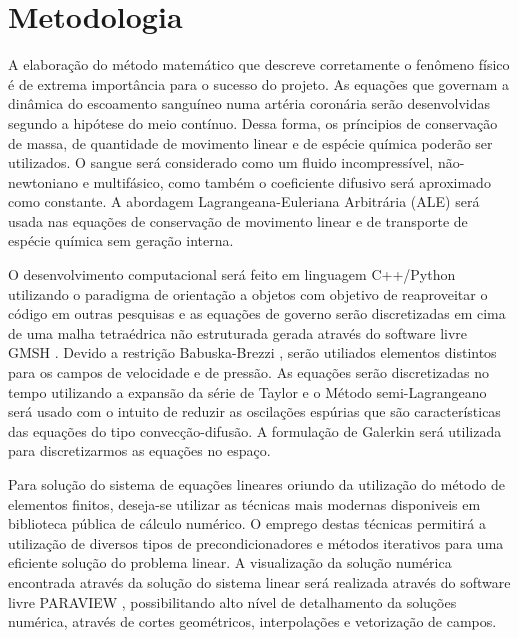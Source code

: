 \section{Metodologia}

A elaboração do método matemático que descreve corretamente o fenômeno físico é de extrema importância para o sucesso do projeto. 
As equações que governam a dinâmica do escoamento sanguíneo numa artéria coronária serão desenvolvidas segundo a hipótese do meio contínuo. 
Dessa forma, os príncipios de conservação de massa, de quantidade de movimento linear e de espécie química poderão ser utilizados. 
O sangue será considerado como um fluido incompressível, não-newtoniano e multifásico, 
como também o coeficiente difusivo será aproximado como constante. 
A abordagem Lagrangeana-Euleriana Arbitrária (ALE) \cite{donea2004} será usada nas equações 
de conservação de movimento linear e 
de transporte de espécie química sem geração interna.

\medskip
O desenvolvimento computacional será feito em linguagem C++/Python \cite{c++} \cite{python} 
utilizando o paradigma de orientação a objetos com objetivo de reaproveitar o código em outras pesquisas e 
as equações de governo serão discretizadas em cima de uma malha tetraédrica não estruturada gerada através do software livre GMSH \cite{gmsh}. 
Devido a restrição Babuska-Brezzi \cite{babuska1971} \cite{brezzi1974}, serão utiliados elementos distintos para os campos de velocidade e de pressão. 
As equações serão discretizadas no tempo utilizando a expansão da série de Taylor e o Método semi-Lagrangeano \cite{pironneau1982} será usado com o intuito de reduzir as oscilações espúrias que são características das equações do tipo convecção-difusão.
A formulação de Galerkin \cite{zienkiewicz1965} será utilizada para discretizarmos as equações no espaço. 

\medskip
Para solução do sistema de equações lineares oriundo da utilização do método de elementos finitos, 
deseja-se utilizar as técnicas mais modernas disponiveis em biblioteca pública de cálculo numérico. 
O emprego destas técnicas permitirá a utilização de diversos tipos de precondicionadores e 
métodos iterativos para uma eficiente solução do problema linear. 
A visualização da solução numérica encontrada através da solução do sistema linear será realizada através do software livre PARAVIEW \cite{paraview}, 
possibilitando alto nível de detalhamento da soluções numérica, através de cortes geométricos, interpolações e vetorização de campos.
